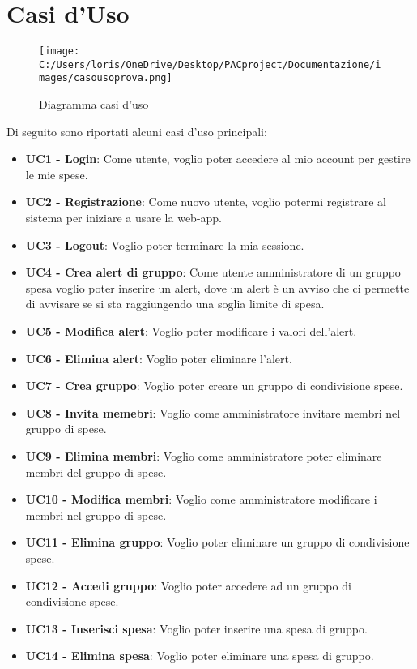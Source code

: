 \section{Casi d'Uso}
    \begin{figure}[h]
        \centering
        \texttt{[image: C:/Users/loris/OneDrive/Desktop/PACproject/Documentazione/images/casousoprova.png]}
        \caption{Diagramma casi d'uso }
    \end{figure}
Di seguito sono riportati alcuni casi d'uso principali:
\begin{itemize}
    \item \textbf{UC1 - Login}: Come utente, voglio poter accedere al mio account per gestire le mie spese.
    \item \textbf{UC2 - Registrazione}: Come nuovo utente, voglio potermi registrare al sistema per iniziare a usare la web-app.
    \item \textbf{UC3 - Logout}: Voglio poter terminare la mia sessione.
    \item \textbf{UC4 - Crea alert di gruppo}: Come utente amministratore di un gruppo spesa voglio poter inserire un alert, dove un alert è un avviso che ci permette di avvisare se si sta raggiungendo una soglia limite di spesa.
    \item \textbf{UC5 - Modifica alert}: Voglio poter modificare i valori dell'alert.
    \item \textbf{UC6 - Elimina alert}: Voglio poter eliminare l'alert. 
    \item \textbf{UC7 - Crea gruppo}: Voglio poter creare un gruppo di condivisione spese. 
    \item \textbf{UC8 - Invita memebri}: Voglio come amministratore invitare membri nel gruppo di spese.
    \item \textbf{UC9 - Elimina membri}: Voglio come amministratore poter eliminare membri del gruppo di spese.
    \item \textbf{UC10 - Modifica membri}: Voglio come amministratore modificare i membri nel gruppo di spese.
    \item \textbf{UC11 - Elimina gruppo}: Voglio poter eliminare un gruppo di condivisione spese. 
    \item \textbf{UC12 - Accedi gruppo}: Voglio poter accedere ad un gruppo di condivisione spese. 
    \item \textbf{UC13 - Inserisci spesa}: Voglio poter inserire una spesa di gruppo.
    \item \textbf{UC14 - Elimina spesa}: Voglio poter eliminare una spesa di gruppo.

\end{itemize}
